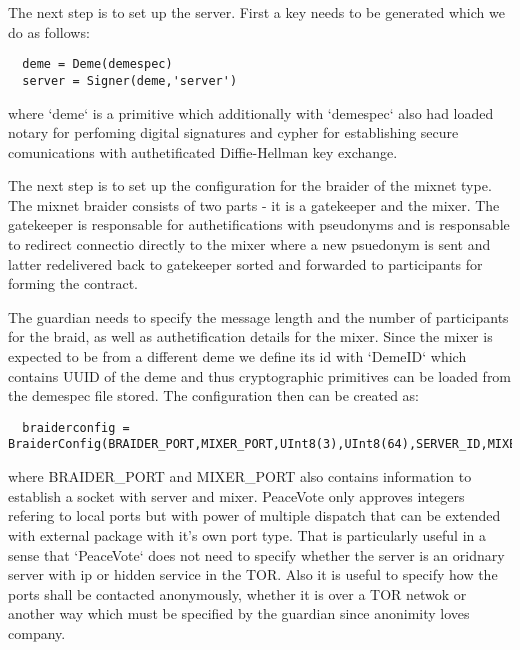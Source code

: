 \documentclass{article}
\begin{document}
The next step is to set up the server. First a key needs to be generated which we do as follows:
\begin{lstlisting}
  deme = Deme(demespec)
  server = Signer(deme,'server')
\end{lstlisting}
where `deme` is a primitive which additionally with `demespec` also had loaded notary for perfoming digital signatures and cypher for establishing secure comunications with authetificated Diffie-Hellman key exchange.

The next step is to set up the configuration for the braider of the mixnet type. The mixnet braider consists of two parts - it is a gatekeeper and the mixer. The gatekeeper is responsable for authetifications with pseudonyms and is responsable to redirect connectio directly to the mixer where a new psuedonym is sent and latter redelivered back to gatekeeper sorted and forwarded to participants for forming the contract. 

The guardian needs to specify the message length and the number of participants for the braid, as well as authetification details for the mixer. Since the mixer is expected to be from a different deme we define its id with `DemeID` which contains UUID of the deme and thus cryptographic primitives can be loaded from the demespec file stored. The configuration then can be created as:
\begin{lstlisting}
  braiderconfig = BraiderConfig(BRAIDER_PORT,MIXER_PORT,UInt8(3),UInt8(64),SERVER_ID,MIXER_ID)
\end{lstlisting}
where BRAIDER\_PORT and MIXER\_PORT also contains information to establish a socket with server and mixer. PeaceVote only approves integers refering to local ports but with power of multiple dispatch that can be extended with external package with it's own port type. That is particularly useful in a sense that `PeaceVote` does not need to specify whether the server is an oridnary server with ip or hidden service in the TOR. Also it is useful to specify how the ports shall be contacted anonymously, whether it is over a TOR netwok or another way which must be specified by the guardian since anonimity loves company.
\end{document}
